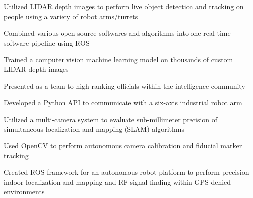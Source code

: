 \documentclass[]{deedy-resume-openfont}
\begin{document}
\begin{minipage}[t]{0.66\textwidth}
\begin{tightemize}
\item Utilized LIDAR depth images to perform live object detection and tracking on people using a variety of robot arms/turrets
\item Combined various open source softwares and algorithms into one real-time software pipeline using ROS
\item Trained a computer vision machine learning model on thousands of custom LIDAR depth images
\item Presented as a team to high ranking officials within the intelligence community
\end{tightemize}
\begin{tightemize}
\item Developed a Python API to communicate with a six-axis industrial robot arm
\item Utilized a multi-camera system to evaluate sub-millimeter precision of simultaneous localization
  and mapping (SLAM) algorithms 
\item Used OpenCV to perform autonomous camera calibration and fiducial marker tracking
\item Created ROS framework for an autonomous robot platform to perform precision indoor localization
  and mapping and RF signal finding within GPS-denied environments
\end{tightemize}
\sectionsep


\end{minipage}
\end{document}
